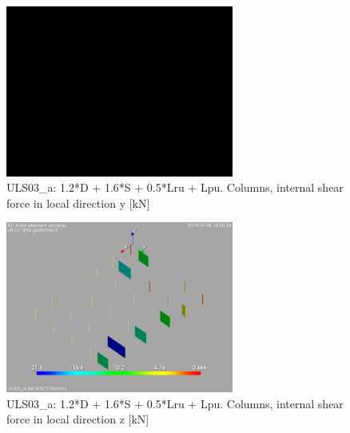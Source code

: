 \begin{figure}
\begin{center}
\includegraphics[width=75mm]{annex_res_columns/graphics/resSimplLC/ULS03_acolumnsQy}
\caption{ULS03\_a: 1.2*D + 1.6*S + 0.5*Lru + Lpu. Columns, internal shear force in local direction y [kN]}
\end{center}
\end{figure}
\begin{figure}
\begin{center}
\includegraphics[width=75mm]{annex_res_columns/graphics/resSimplLC/ULS03_acolumnsQz}
\caption{ULS03\_a: 1.2*D + 1.6*S + 0.5*Lru + Lpu. Columns, internal shear force in local direction z [kN]}
\end{center}
\end{figure}

